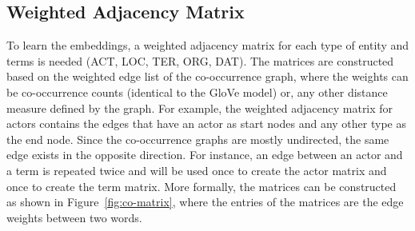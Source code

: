 \subsection{Weighted Adjacency Matrix}\label{sec:adj_matrix}
To learn the embeddings, a weighted adjacency matrix for each type of entity and terms is needed (ACT, LOC, TER, ORG, DAT). The matrices are constructed based on the weighted edge list of the co-occurrence graph, where the weights can be co-occurrence counts (identical to the GloVe model) or, any other distance measure defined by the graph. For example, the weighted adjacency matrix for actors contains the edges that have an actor as start nodes and any other type as the end node. Since the co-occurrence graphs are mostly undirected, the same edge exists in the opposite direction. For instance, an edge between an actor and a term is repeated twice and will be used once to create the actor matrix and once to create the term matrix. More formally, the matrices can be constructed as shown in Figure~\ref{fig:co-matrix}, where the entries of the matrices are the edge weights between two words.  
